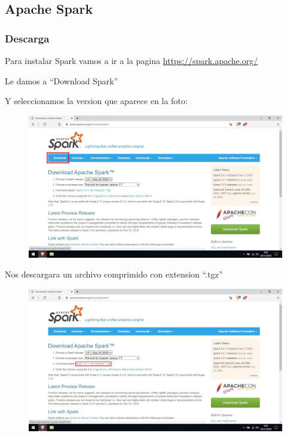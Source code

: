\documentclass[a4paper,10pt]{article}
\begin{document}
\subsection{Apache Spark}

\subsubsection{Descarga}

Para instalar Spark vamos a ir a la pagina \href{https://spark.apache.org/}{https://spark.apache.org/}  

Le damos a “Download Spark” 

Y seleccionamos la version que aparece en la foto: 

\begin{figure}[H]
\begin{center}
\includegraphics[width=500pt]{./fotos/introduccion/5 - Spark 2 (V).jpg}
\end{center}
\end{figure}

Nos descargara un archivo comprimido con extension “.tgz” 

\begin{figure}[H]
\begin{center}
\includegraphics[width=500pt]{./fotos/introduccion/4 - Spark (V).jpg}
\end{center}
\end{figure}
\end{document}
